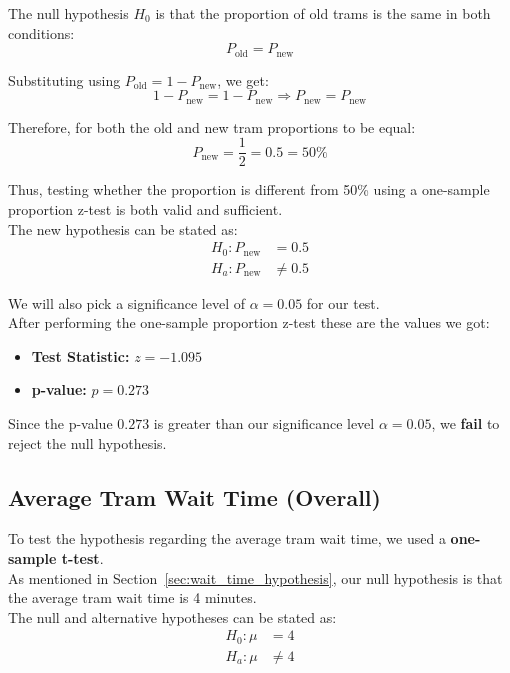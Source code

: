 \documentclass[a4paper, 10pt]{article}
\begin{document}
			\noindent The null hypothesis \( H_0 \) is that the proportion of old trams is the same in both conditions:
			\[
			P_{\text{old}} = P_{\text{new}}
			\]

			\noindent Substituting using \( P_{\text{old}} = 1 - P_{\text{new}} \), we get:
			\[
			1 - P_{\text{new}} = 1 - P_{\text{new}}
			\Rightarrow P_{\text{new}} = P_{\text{new}}
			\]

			\noindent Therefore, for both the old and new tram proportions to be equal:
			\[
			P_{\text{new}} = \frac{1}{2} = 0.5 = 50\%
			\]

			\noindent Thus, testing whether the proportion is different from 50\% using a 
			one-sample proportion z-test is both valid and sufficient. \\ 

			\noindent The new hypothesis can be stated as: 
			\begin{align*}
				H_0: P_{\text{new}} &= 0.5 \\
				H_a: P_{\text{new}} &\neq 0.5
			\end{align*}

			\noindent We will also pick a significance level of \( \alpha = 0.05 \) for our test. \\

			After performing the one-sample proportion z-test these are the values we got:
			\begin{itemize}
				\item \textbf{Test Statistic:} \( z = -1.095 \)
				\item \textbf{p-value:} \( p = 0.273 \)
			\end{itemize}

			\noindent Since the p-value \( 0.273 \) is greater than our significance level \( \alpha = 0.05 \), 
			we \textbf{fail} to reject the null hypothesis.
		
		\subsection{Average Tram Wait Time (Overall)}
			\noindent To test the hypothesis regarding the average tram wait time, we used a \textbf{one-sample t-test}. \\

			\noindent As mentioned in Section~\ref{sec:wait_time_hypothesis}, our null hypothesis is that the average tram wait time is 4 minutes. \\

			\noindent The null and alternative hypotheses can be stated as:
			\begin{align*}
				H_0: \mu &= 4 \\
				H_a: \mu &\neq 4
			\end{align*}
\end{document}
